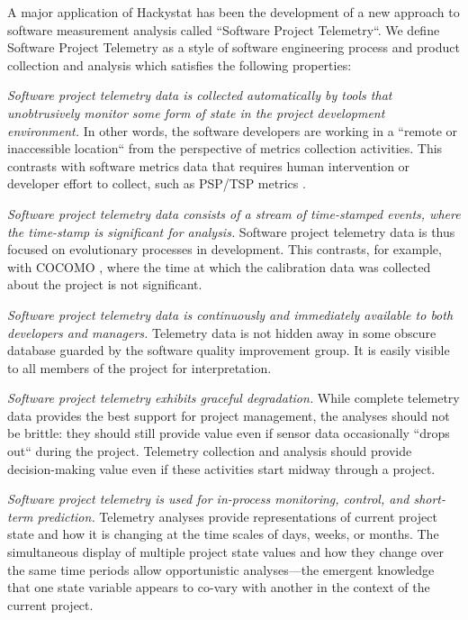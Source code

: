 A major application of Hackystat has been the development of a new
approach to software measurement analysis called ``Software Project
Telemetry``. We define Software Project Telemetry as a style of
software engineering process and product collection and analysis which
satisfies the following properties:

{\em Software project telemetry data is collected automatically by tools
that unobtrusively monitor some form of state in the project development
environment.}  In other words, the software developers are working in a
``remote or inaccessible location`` from the perspective of metrics
collection activities. This contrasts with software metrics data that
requires human intervention or developer effort to collect, such as PSP/TSP
metrics \cite{Humphrey95}.
        
{\em Software project telemetry data consists of a stream of time-stamped
events, where the time-stamp is significant for analysis.}  Software
project telemetry data is thus focused on evolutionary processes in
development.  This contrasts, for example, with COCOMO \cite{Boehm00},
where the time at which the calibration data was collected about the
project is not significant.

{\em Software project telemetry data is continuously and immediately
available to both developers and managers.}  Telemetry data is not hidden
away in some obscure database guarded by the software quality improvement
group.  It is easily visible to all members of the project for
interpretation.

{\em Software project telemetry exhibits graceful degradation.}  While
complete telemetry data provides the best support for project management,
the analyses should not be brittle: they should still provide value even if
sensor data occasionally ``drops out`` during the project. Telemetry
collection and analysis should provide decision-making value even if these
activities start midway through a project.
         
{\em Software project telemetry is used for in-process monitoring, control,
and short-term prediction.} Telemetry analyses provide representations of
current project state and how it is changing at the time scales of days,
weeks, or months.  The simultaneous display of multiple project state
values and how they change over the same time periods allow opportunistic
analyses---the emergent knowledge that one state variable appears to
co-vary with another in the context of the current project.

